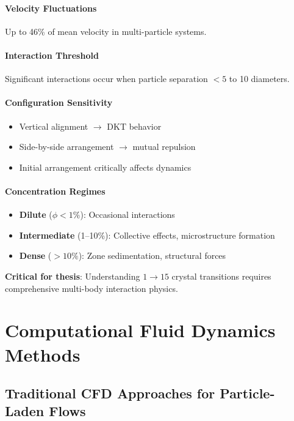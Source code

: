 \subsection{Velocity Fluctuations}
Up to 46\% of mean velocity in multi-particle systems.

\subsection{Interaction Threshold}
Significant interactions occur when particle separation $< 5$ to 10 diameters.

\subsection{Configuration Sensitivity}
\begin{itemize}
    \item Vertical alignment $\rightarrow$ DKT behavior
    \item Side-by-side arrangement $\rightarrow$ mutual repulsion
    \item Initial arrangement critically affects dynamics
\end{itemize}

\subsection{Concentration Regimes}
\begin{itemize}
    \item \textbf{Dilute} ($\phi < 1\%$): Occasional interactions
    \item \textbf{Intermediate} (1--10\%): Collective effects, microstructure formation
    \item \textbf{Dense} ($>10\%$): Zone sedimentation, structural forces
\end{itemize}

\textbf{Critical for thesis}: Understanding $1 \rightarrow 15$ crystal transitions requires comprehensive multi-body interaction physics.

\part{Computational Fluid Dynamics Methods}

\chapter{Traditional CFD Approaches for Particle-Laden Flows}

